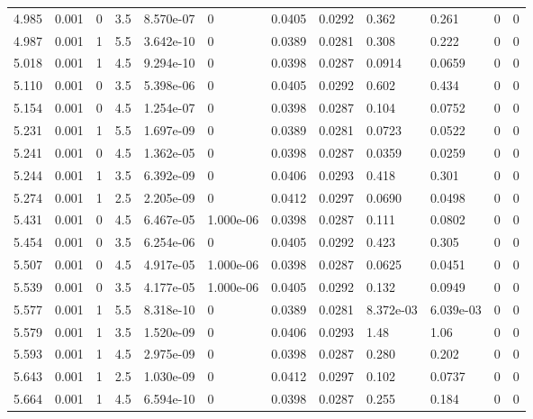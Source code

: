 \documentclass[preview]{standalone}
\begin{document}
{{{{\begin{tabular}{L{1.2cm}C{1.2cm} C{0.3cm}C{0.5cm} C{1.4cm}C{1.4cm} C{1.4cm}C{1.4cm} C{1.6cm}C{1.6cm} C{1.6cm}C{1.6cm}}
  4.985  &  0.001  & 0     & 3.5 &  8.570e-07  & 0  &  0.0405&   0.0292& 0.362 & 0.261   &  0 & 0  \\ 
  4.987  &  0.001  & 1     & 5.5 &  3.642e-10  & 0  &  0.0389&   0.0281& 0.308 & 0.222   &  0 & 0  \\ 
  5.018  &  0.001  & 1     & 4.5 &  9.294e-10  & 0  &  0.0398&   0.0287& 0.0914 & 0.0659   &  0 & 0  \\ 
  5.110  &  0.001  & 0     & 3.5 &  5.398e-06  & 0  &  0.0405&   0.0292& 0.602 & 0.434   &  0 & 0  \\ 
  5.154  &  0.001  & 0     & 4.5 &  1.254e-07  & 0  &  0.0398&   0.0287& 0.104 & 0.0752   &  0 & 0  \\ 
  5.231  &  0.001  & 1     & 5.5 &  1.697e-09  & 0  &  0.0389&   0.0281& 0.0723 & 0.0522   &  0 & 0  \\ 
  5.241  &  0.001  & 0     & 4.5 &  1.362e-05  & 0  &  0.0398&   0.0287& 0.0359 & 0.0259   &  0 & 0  \\ 
  5.244  &  0.001  & 1     & 3.5 &  6.392e-09  & 0  &  0.0406&   0.0293& 0.418 & 0.301   &  0 & 0  \\ 
  5.274  &  0.001  & 1     & 2.5 &  2.205e-09  & 0  &  0.0412&   0.0297& 0.0690 & 0.0498   &  0 & 0  \\ 
  5.431  &  0.001  & 0     & 4.5 &  6.467e-05  & 1.000e-06  &  0.0398&   0.0287& 0.111 & 0.0802   &  0 & 0  \\ 
  5.454  &  0.001  & 0     & 3.5 &  6.254e-06  & 0  &  0.0405&   0.0292& 0.423 & 0.305   &  0 & 0  \\ 
  5.507  &  0.001  & 0     & 4.5 &  4.917e-05  & 1.000e-06  &  0.0398&   0.0287& 0.0625 & 0.0451   &  0 & 0  \\ 
  5.539  &  0.001  & 0     & 3.5 &  4.177e-05  & 1.000e-06  &  0.0405&   0.0292& 0.132 & 0.0949   &  0 & 0  \\ 
  5.577  &  0.001  & 1     & 5.5 &  8.318e-10  & 0  &  0.0389&   0.0281& 8.372e-03 & 6.039e-03   &  0 & 0  \\ 
  5.579  &  0.001  & 1     & 3.5 &  1.520e-09  & 0  &  0.0406&   0.0293& 1.48 & 1.06   &  0 & 0  \\ 
  5.593  &  0.001  & 1     & 4.5 &  2.975e-09  & 0  &  0.0398&   0.0287& 0.280 & 0.202   &  0 & 0  \\ 
  5.643  &  0.001  & 1     & 2.5 &  1.030e-09  & 0  &  0.0412&   0.0297& 0.102 & 0.0737   &  0 & 0  \\ 
  5.664  &  0.001  & 1     & 4.5 &  6.594e-10  & 0  &  0.0398&   0.0287& 0.255 & 0.184   &  0 & 0  \\ 

\end{tabular}}}}}
\end{document}
